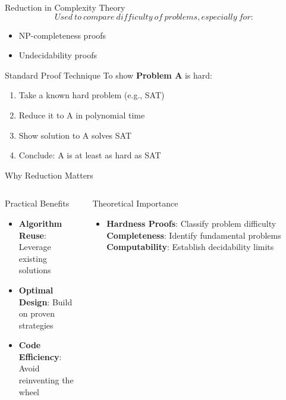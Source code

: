 \documentclass{beamer}
\begin{document}
\begin{frame}{Reduction in Complexity Theory}
    \textbf{\color{myred}{Proving Problem Hardness}}
        \[Used \ to \ compare \ difficulty \ of  \ problems, especially  \  for:\]
        \begin{itemize}
            \item NP-completeness proofs
            \item Undecidability proofs
        \end{itemize}
    
    \begin{exampleblock}{Standard Proof Technique}
        To show \textbf{Problem A} is hard:
        \begin{enumerate}
            \item Take a known hard problem (e.g., SAT)
            \item Reduce it to A in polynomial time
            \item Show solution to A solves SAT
            \item Conclude: A is at least as hard as SAT
        \end{enumerate}
    \end{exampleblock}

\end{frame}

\begin{frame}{Why Reduction Matters}
    \begin{columns}[T]
        \begin{column}{0.5\textwidth}
            \begin{block}{Practical Benefits}
                \begin{itemize}
                    \item \textbf{Algorithm Reuse}: Leverage existing solutions
                    \item \textbf{Optimal Design}: Build on proven strategies
                    \item \textbf{Code Efficiency}: Avoid reinventing the wheel
                \end{itemize}
            \end{block}
        \end{column}
        
        \begin{column}{0.5\textwidth}
            \begin{block}{Theoretical Importance}
                \begin{itemize}
                    \item \textbf{Hardness Proofs}: Classify problem difficulty
                    \textbf{Completeness}: Identify fundamental problems
                    \textbf{Computability}: Establish decidability limits
                \end{itemize}
            \end{block}
        \end{column}
    \end{columns}
\end{frame}
\end{document}

